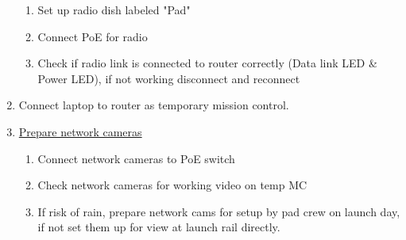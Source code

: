 \begin{enumerate}[label=PP\arabic*.]
\begin{enumerate}[label*=\arabic*.]
            \item Set up radio dish labeled "Pad"\leftcheckbox
            \item Connect PoE for radio \leftcheckbox
            \item Check if radio link is connected to router correctly (Data link LED \& Power LED), if not working disconnect and reconnect \leftcheckbox
        \end{enumerate}
    \item Connect laptop to router as temporary mission control.\checkbox
    \item \label{network_cam} \underline{Prepare network cameras}
        \begin{enumerate}[label*=\arabic*.]
            \item Connect network cameras to PoE switch \leftcheckbox
            \item Check network cameras for working video on temp MC \leftcheckbox
            \item If risk of rain, prepare network cams for setup by pad crew on launch day, if not set them up for view at launch rail directly. \leftcheckbox
        \end{enumerate}


\end{enumerate}
